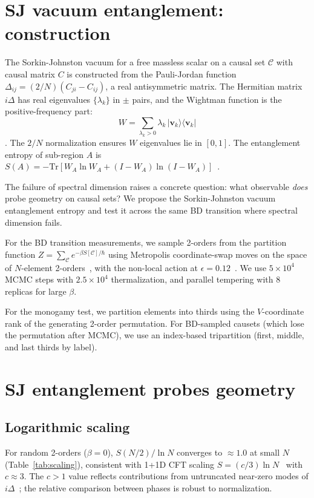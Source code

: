 \documentclass[aps,prd,twocolumn,superscriptaddress,nofootinbib]{revtex4-2}
\begin{document}
\section{SJ vacuum entanglement: construction}

The Sorkin-Johnston vacuum for a free massless scalar on a causal set $\mathcal{C}$ with causal matrix $C$ is constructed from the Pauli-Jordan function $\Delta_{ij} = (2/N)(C_{ji} - C_{ij})$, a real antisymmetric matrix. The Hermitian matrix $i\Delta$ has real eigenvalues $\{\lambda_k\}$ in $\pm$ pairs, and the Wightman function is the positive-frequency part:
\begin{equation}
W = \sum_{\lambda_k > 0} \lambda_k \, |\mathbf{v}_k\rangle\langle\mathbf{v}_k|
\end{equation}
\cite{johnston2009}. The $2/N$ normalization ensures $W$ eigenvalues lie in $[0,1]$. The entanglement entropy of sub-region $A$ is $S(A) = -\mathrm{Tr}[W_A\ln W_A + (I-W_A)\ln(I-W_A)]$~\cite{sorkin2012}.

The failure of spectral dimension raises a concrete question: what observable \emph{does} probe geometry on causal sets? We propose the Sorkin-Johnston vacuum entanglement entropy and test it across the same BD transition where spectral dimension fails.

For the BD transition measurements, we sample 2-orders from the partition function $Z = \sum_\mathcal{C} e^{-\beta S[\mathcal{C}]/\hbar}$ using Metropolis coordinate-swap moves on the space of $N$-element 2-orders~\cite{surya2012}, with the non-local action at $\epsilon = 0.12$~\cite{glaser2018}. We use $5 \times 10^4$ MCMC steps with $2.5 \times 10^4$ thermalization, and parallel tempering with 8 replicas for large $\beta$.

For the monogamy test, we partition elements into thirds using the $V$-coordinate rank of the generating 2-order permutation. For BD-sampled causets (which lose the permutation after MCMC), we use an index-based tripartition (first, middle, and last thirds by label).

\section{SJ entanglement probes geometry}

\subsection{Logarithmic scaling}

For random 2-orders ($\beta = 0$), $S(N/2)/\ln N$ converges to $\approx 1.0$ at small $N$ (Table~\ref{tab:scaling}), consistent with 1+1D CFT scaling $S = (c/3)\ln N$~\cite{calabrese2004} with $c \approx 3$. The $c > 1$ value reflects contributions from untruncated near-zero modes of $i\Delta$~\cite{sorkin_yazdi2018}; the relative comparison between phases is robust to normalization.
\end{document}
